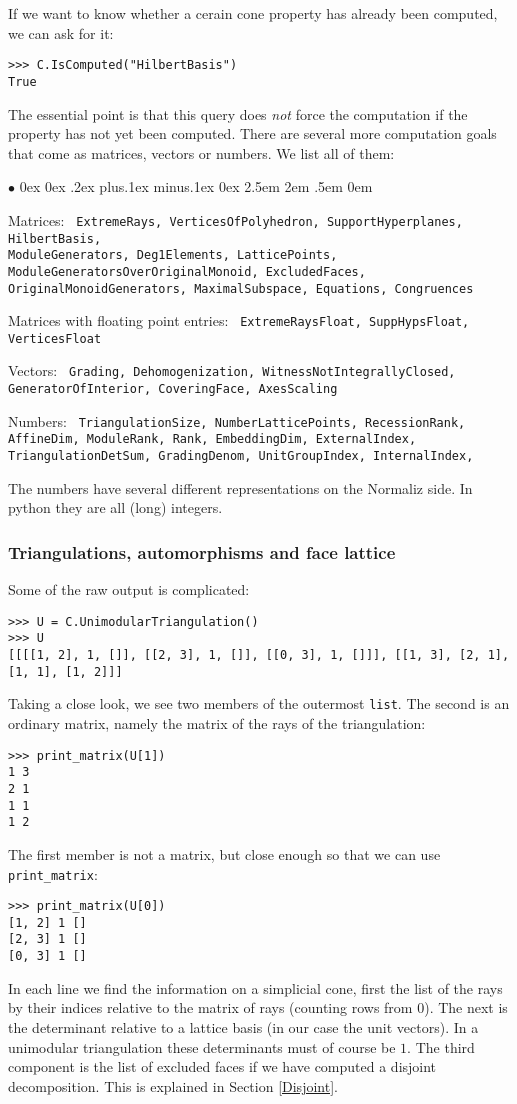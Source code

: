 \documentclass[12pt,a4paper]{scrartcl}
\newcommand{\stdli}{ \topsep0ex \partopsep0ex %
\parsep.2ex plus.1ex minus.1ex \itemsep0ex%
\leftmargin2.5em \labelwidth2em \labelsep.5em \rightmargin0em}%
\renewenvironment{itemize}{\begin{list}{{$\bullet$}}{\stdli}}{\end{list}}
\theoremstyle{definition}
\def\ttt{\texttt}
\begin{document}
\begin{small}
If we want to know whether a cerain cone property has already been computed, we can ask for it:
\begin{Verbatim}
>>> C.IsComputed("HilbertBasis")
True
\end{Verbatim}
The essential point is that this query does \emph{not} force the computation if the property has not yet been computed.
There are several more computation goals that come as matrices, vectors or numbers. We list all of them:
\begin{itemize}
	\item Matrices: \ttt{    ExtremeRays,
		VerticesOfPolyhedron,
		SupportHyperplanes,
		HilbertBasis,\\
		ModuleGenerators,
		Deg1Elements,
		LatticePoints,
		ModuleGeneratorsOverOriginalMonoid,
		ExcludedFaces,
		OriginalMonoidGenerators,
		MaximalSubspace,
		Equations,
		Congruences}
	\item Matrices with floating point entries: \ttt{    ExtremeRaysFloat,
		SuppHypsFloat,
		VerticesFloat}
	\item Vectors: \ttt{    Grading,
		Dehomogenization,
		WitnessNotIntegrallyClosed,
		GeneratorOfInterior,
		CoveringFace,
		AxesScaling}
	\item Numbers: \ttt{    
		TriangulationSize,
		NumberLatticePoints,
		RecessionRank,
		AffineDim,
		ModuleRank,
		Rank,
		EmbeddingDim,  	
		ExternalIndex,
		TriangulationDetSum,
		GradingDenom,
		UnitGroupIndex,
		InternalIndex,}
\end{itemize}

The numbers have several different representations on the Normaliz side. In python they are all (long) integers.
\subsubsection{Triangulations, automorphisms and face lattice}
Some of the raw output is complicated:
\begin{Verbatim}
>>> U = C.UnimodularTriangulation()
>>> U
[[[[1, 2], 1, []], [[2, 3], 1, []], [[0, 3], 1, []]], [[1, 3], [2, 1], [1, 1], [1, 2]]]
\end{Verbatim}
Taking a close look, we see two members of the outermost \verb|list|. The second is an ordinary matrix, namely the matrix of the rays of the triangulation:
\begin{Verbatim}
>>> print_matrix(U[1])
1 3
2 1
1 1
1 2
\end{Verbatim}
The first member is not a matrix, but close enough so that we can use \verb|print_matrix|:
\begin{Verbatim}
>>> print_matrix(U[0])
[1, 2] 1 []
[2, 3] 1 []
[0, 3] 1 []
\end{Verbatim}
In each line we find the information on a simplicial cone, first the list of the rays by their indices relative to the matrix of rays (counting rows from $0$). The next is the determinant relative to a lattice basis (in our case the unit vectors). In a unimodular triangulation these determinants must of course be $1$. The third component is the list of excluded faces if we have computed a disjoint decomposition. This is explained in Section \ref{Disjoint}.


\end{small}
\end{document}
